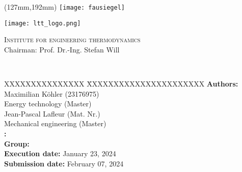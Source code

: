 \begin{titlepage}
	\thispagestyle{empty}

	\begin{textblock*}{\textwidth}(127mm,192mm)
	\texttt{[image: fausiegel]}
	\end{textblock*}

	\begin{minipage}[]{47mm}
		\texttt{[image: ltt\_logo.png]}
	\end{minipage}
	\begin{minipage}[]{.7\textwidth}
		\raggedleft
		\textsc{Institute for engineering thermodynamics}\\ %
		Chairman: Prof. Dr.-Ing. Stefan Will
	\end{minipage}
	
	\vspace{51mm}
	
	{\centering
	
	\large{\arbeit} \\	
	\Large{\textbf{\titel}}
	
	\par}
	
	\vfill
	
	{\raggedright
	\begin{tabbing}
	XXXXXXXXXXXXXXX \= XXXXXXXXXXXXXXXXXXXXXX \kill
		\textbf{Authors:} 			\> Maximilian Köhler (23176975) \\	
									\> Energy technology (Master) \\[12pt]
									\> Jean-Pascal Lafleur (Mat. Nr.) \\
									\> Mechanical engineering (Master) \\[12pt]
		\textbf{\langdbbetreuer:}	\> \betreuer 						\\[6pt]
		\textbf{Group:}												\\[12pt]
		\textbf{Execution date:}	\> January 23, 2024 			\\[12pt]
		\textbf{Submission date:}	\> February 07, 2024														
	\end{tabbing}
	\par}
\end{titlepage}
